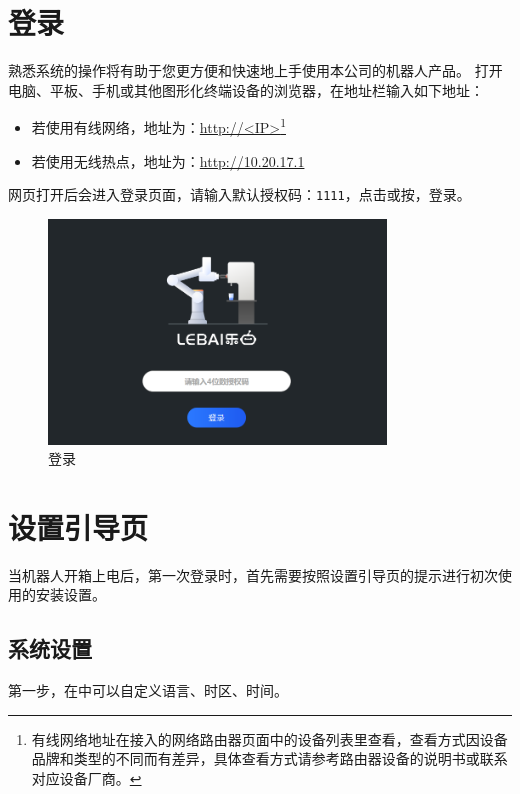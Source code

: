 \clearpage

\section{登录\LM}
熟悉\LM 系统的操作将有助于您更方便和快速地上手使用本公司的机器人产品。
打开电脑、平板、手机或其他图形化终端设备的浏览器，在地址栏输入如下地址：
\begin{itemize}
	\item 若使用有线网络，地址为：\url{http://<IP>}\footnote{有线网络地址在接入的网络路由器页面中的设备列表里查看，查看方式因设备品牌和类型的不同而有差异，具体查看方式请参考路由器设备的说明书或联系对应设备厂商。}
	\item 若使用无线热点，地址为：\url{http://10.20.17.1}
\end{itemize}

网页打开后会进入登录页面，请输入默认授权码：\verb|1111|，点击或按，登录\LM。

\begin{figure}[ht]
    \centering
    \includegraphics[width=0.8\textwidth]{screen/2-4.png}
    \caption{登录\LM}
    \label{fig:登录LM}
\end{figure}

\clearpage

\section{设置引导页}

当机器人开箱上电后，第一次登录\LM 时，首先需要按照设置引导页的提示进行初次使用的安装设置。
\subsection{系统设置}
第一步，在中可以自定义语言、时区、时间。

